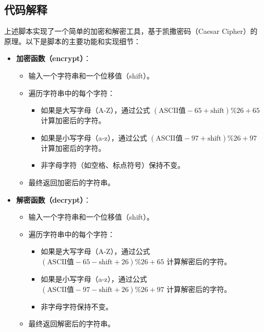 \documentclass[12pt,hyperref,a4paper,UTF8]{ctexart}
\begin{document}
\subsection{代码解释}

上述脚本实现了一个简单的加密和解密工具，基于凯撒密码（Caesar Cipher）的原理。以下是脚本的主要功能和实现细节：

\begin{itemize}
    \item \textbf{加密函数（encrypt）}：
    \begin{itemize}
        \item 输入一个字符串和一个位移值（shift）。
        \item 遍历字符串中的每个字符：
        \begin{itemize}
            \item 如果是大写字母（A-Z），通过公式 \((\text{ASCII值} - 65 + \text{shift}) \% 26 + 65\) 计算加密后的字符。
            \item 如果是小写字母（a-z），通过公式 \((\text{ASCII值} - 97 + \text{shift}) \% 26 + 97\) 计算加密后的字符。
            \item 非字母字符（如空格、标点符号）保持不变。
        \end{itemize}
        \item 最终返回加密后的字符串。
    \end{itemize}

    \item \textbf{解密函数（decrypt）}：
    \begin{itemize}
        \item 输入一个字符串和一个位移值（shift）。
        \item 遍历字符串中的每个字符：
        \begin{itemize}
            \item 如果是大写字母（A-Z），通过公式 \((\text{ASCII值} - 65 - \text{shift} + 26) \% 26 + 65\) 计算解密后的字符。
            \item 如果是小写字母（a-z），通过公式 \((\text{ASCII值} - 97 - \text{shift} + 26) \% 26 + 97\) 计算解密后的字符。
            \item 非字母字符保持不变。
        \end{itemize}
        \item 最终返回解密后的字符串。
    \end{itemize}


\end{itemize}
\end{document}
